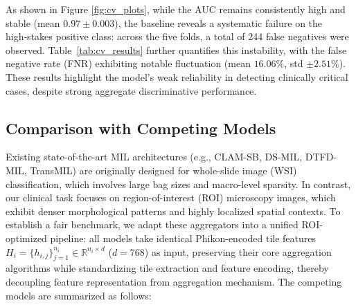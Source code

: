 \documentclass[journal,twoside,web]{ieeecolor}
\begin{document}
As shown in Figure \ref{fig:cv_plots}, while the AUC remains consistently high and stable (mean $0.97 \pm 0.003$), the baseline reveals a systematic failure on the high‑stakes positive class: across the five folds, a total of 244 false negatives were observed. Table~\ref{tab:cv_results} further quantifies this instability, with the false negative rate (FNR) exhibiting notable fluctuation (mean $16.06\%$, std $\pm 2.51\%$). These results highlight the model's weak reliability in detecting clinically critical cases, despite strong aggregate discriminative performance.


\subsection{Comparison with Competing Models}\label{S3-3}

Existing state-of-the-art MIL architectures (e.g., CLAM-SB, DS-MIL, DTFD-MIL, TransMIL) are originally designed for whole-slide image (WSI) classification, which involves large bag sizes and macro-level sparsity. In contrast, our clinical task focuses on region-of-interest (ROI) microscopy images, which exhibit denser morphological patterns and highly localized spatial contexts. To establish a fair benchmark, we adapt these aggregators into a unified ROI-optimized pipeline: all models take identical Phikon-encoded \cite{filiot2023scaling} tile features $H_i = \{h_{i,j}\}_{j=1}^{n_i} \in \mathbb{R}^{n_i \times d}$ ($d=768$) as input, preserving their core aggregation algorithms while standardizing tile extraction and feature encoding, thereby decoupling feature representation from aggregation mechanism. The competing models are summarized as follows:
\end{document}
